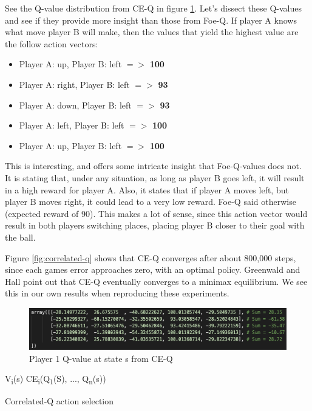 \documentclass[conference]{IEEEtran}
\begin{document}
See the Q-value distribution from CE-Q in figure \ref{fig:ce-q-values}. Let's dissect these Q-values and see if they provide more insight than those from Foe-Q. If player A knows what move player B will make, then the values that yield the highest value are the follow action vectors:

\begin{itemize}
    \item Player A: up, Player B: left $=>$ \textbf{100}
    \item Player A: right, Player B: left $=>$ \textbf{93}
    \item Player A: down, Player B: left $=>$ \textbf{93}
    \item Player A: left, Player B: left $=>$ \textbf{100}
    \item Player A: up, Player B: left $=>$ \textbf{100}
\end{itemize}

This is interesting, and offers some intricate insight that Foe-Q-values does not. It is stating that, under any situation, as long as player B goes left, it will result in a high reward for player A. Also, it states that if player A moves left, but player B moves right, it could lead to a very low reward. Foe-Q said otherwise (expected reward of 90). This makes a lot of sense, since this action vector would result in both players switching places, placing player B closer to their goal with the ball.

Figure \ref{fig:correlated-q} shows that CE-Q converges after about 800,000 steps, since each games error approaches zero, with an optimal policy. Greenwald and Hall point out that CE-Q eventually converges to a minimax equilibrium. We see this in our own results when reproducing these experiments.

\begin{figure}[]
    \centering
    \includegraphics[scale=0.42]{figs/ce-q-values}
    \caption{Player 1 Q-value at state s from CE-Q}
    \label{fig:ce-q-values}
\end{figure}

\begin{algorithm}
    \label{alg:ce-q}
    V\textsubscript{i}(s) \in CE\textsubscript{i}(Q\textsubscript{1}(S), ..., Q\textsubscript{n}(s))
    \caption{Correlated-Q action selection}
\end{algorithm}
\end{document}
